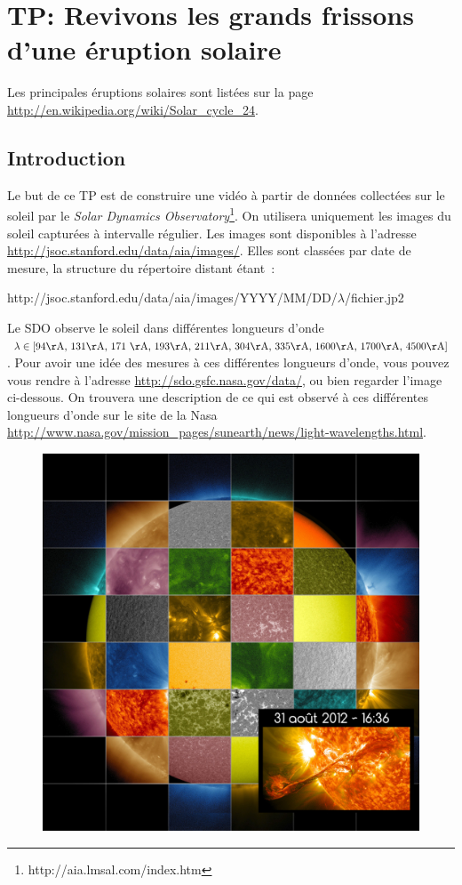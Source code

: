 \section{TP: Revivons les grands frissons d'une éruption solaire}

Les principales éruptions solaires sont listées sur la page \url{http://en.wikipedia.org/wiki/Solar_cycle_24}.

\subsection{Introduction}

Le but de ce TP est de construire une vidéo à partir de données collectées sur le soleil par le \emph{Solar Dynamics Observatory}\footnote{http://aia.lmsal.com/index.htm}. On utilisera uniquement les images du soleil capturées à intervalle régulier. Les images sont disponibles à l'adresse \url{http://jsoc.stanford.edu/data/aia/images/}. Elles sont classées par date de mesure, la structure du répertoire distant étant~:
\begin{center}
http://jsoc.stanford.edu/data/aia/images/YYYY/MM/DD/$\lambda$/fichier.jp2
\end{center}

Le SDO observe le soleil dans différentes longueurs d'onde $\lambda \in [\mathlist{94\si{\AA}, 131\si{\AA}, 171 \si{\AA}, 193\si{\AA}, 211\si{\AA}, 304\si{\AA}, 335\si{\AA}, 1600\si{\AA}, 1700\si{\AA}, 4500\si{\AA}}]$. Pour avoir une idée des mesures à ces différentes longueurs d'onde, vous pouvez vous rendre à l'adresse \url{http://sdo.gsfc.nasa.gov/data/}, ou bien regarder l'image ci-dessous. On trouvera une description de ce qui est observé à ces différentes longueurs d'onde sur le site de la Nasa \url{http://www.nasa.gov/mission_pages/sunearth/news/light-wavelengths.html}.
\begin{figure}[htbp]
\includegraphics[width=0.65\linewidth]{Figs/solar_wavelength2.jpg}
\end{figure}


